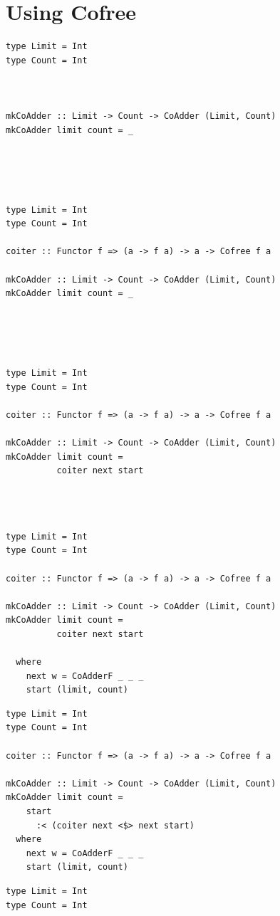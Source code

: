 \documentclass{beamer}
\begin{document}
\section{Using Cofree}

\begin{frame}[fragile]
  \begin{overprint}
  \begin{verbatim}
type Limit = Int
type Count = Int



mkCoAdder :: Limit -> Count -> CoAdder (Limit, Count)
mkCoAdder limit count = _





  \end{verbatim}
  \begin{verbatim}
type Limit = Int
type Count = Int

coiter :: Functor f => (a -> f a) -> a -> Cofree f a

mkCoAdder :: Limit -> Count -> CoAdder (Limit, Count)
mkCoAdder limit count = _





  \end{verbatim}
  \begin{verbatim}
type Limit = Int
type Count = Int

coiter :: Functor f => (a -> f a) -> a -> Cofree f a

mkCoAdder :: Limit -> Count -> CoAdder (Limit, Count)
mkCoAdder limit count =
          coiter next start




  \end{verbatim}
  \begin{verbatim}
type Limit = Int
type Count = Int

coiter :: Functor f => (a -> f a) -> a -> Cofree f a

mkCoAdder :: Limit -> Count -> CoAdder (Limit, Count)
mkCoAdder limit count =
          coiter next start

  where
    next w = CoAdderF _ _ _
    start (limit, count)
  \end{verbatim}
  \begin{verbatim}
type Limit = Int
type Count = Int

coiter :: Functor f => (a -> f a) -> a -> Cofree f a

mkCoAdder :: Limit -> Count -> CoAdder (Limit, Count)
mkCoAdder limit count =
    start
      :< (coiter next <$> next start)
  where
    next w = CoAdderF _ _ _
    start (limit, count)
  \end{verbatim}
  \begin{verbatim}
type Limit = Int
type Count = Int


\end{verbatim}
\end{overprint}
\end{frame}
\end{document}
